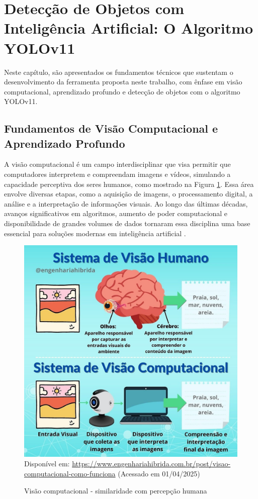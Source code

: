 \section{\textbf{Detecção de Objetos com Inteligência Artificial: O Algoritmo YOLOv11}}

Neste capítulo, são apresentados os fundamentos técnicos que sustentam o desenvolvimento da ferramenta proposta neste trabalho, com ênfase em visão computacional, aprendizado profundo e detecção de objetos com o algoritmo YOLOv11.

\subsection{\textbf{Fundamentos de Visão Computacional e Aprendizado Profundo}}

A visão computacional é um campo interdisciplinar que visa permitir que computadores interpretem e compreendam imagens e vídeos, simulando a capacidade perceptiva dos seres humanos, como mostrado na Figura \ref{fg-visao-computacional}. Essa área envolve diversas etapas, como a aquisição de imagens, o processamento digital, a análise e a interpretação de informações visuais. Ao longo das últimas décadas, avanços significativos em algoritmos, aumento de poder computacional e disponibilidade de grandes volumes de dados tornaram essa disciplina uma base essencial para soluções modernas em inteligência artificial  \cite{szeliski2022}.

\begin{figure}[htbp]
  \centering
  \caption{Visão computacional - similaridade com percepção humana}
  \includegraphics[width=0.8 \textwidth]{Figuras/visao-computacional.jpg}
  \\
  Disponível em: \url{https://www.engenhariahibrida.com.br/post/visao-computacional-como-funciona} (Acessado em 01/04/2025)
  \label{fg-visao-computacional}
\end{figure}

